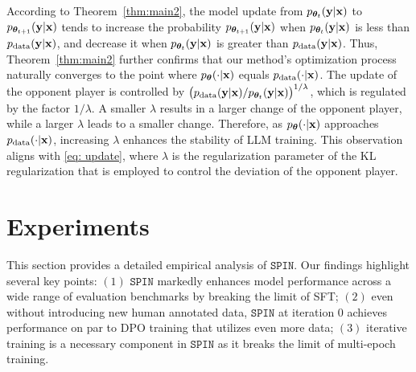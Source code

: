 \documentclass{article}
\newcommand{\method}{\texttt{SPIN}}
\begin{document}
\begin{remark}
According to Theorem~\ref{thm:main2}, the model update from $p_{\bm{\theta}_t}(\mathbf{y}|\mathbf{x})$ to $p_{\bm{\theta}_{t+1}}(\mathbf{y}|\mathbf{x})$ tends to increase the probability $p_{\bm{\theta}_{t+1}}(\mathbf{y}|\mathbf{x})$ when $p_{\bm{\theta}_t}(\mathbf{y}|\mathbf{x})$ is less than $p_{\mathrm{data}}(\mathbf{y}|\mathbf{x})$, and decrease it when $p_{\bm{\theta}_t}(\mathbf{y}|\mathbf{x})$ is greater than $p_{\mathrm{data}}(\mathbf{y}|\mathbf{x})$. Thus, Theorem~\ref{thm:main2} further confirms that our method's optimization process naturally converges to the point where $p_{\bm{\theta}}(\cdot|\mathbf{x})$ equals $p_{\mathrm{data}}(\cdot|\mathbf{x})$. The update of the opponent player is controlled by $\big(p_{\mathrm{data}}(\mathbf{y}|\mathbf{x})/p_{\bm{\theta}_{t}}(\mathbf{y}|\mathbf{x}) \big)^{1/\lambda}$, which is regulated by the factor $1/\lambda$. A smaller $\lambda$ results in a larger change of the opponent player, while a larger $\lambda$ leads to a smaller change. Therefore, as $p_{\bm{\theta}}(\cdot|\mathbf{x})$ approaches $p_{\mathrm{data}}(\cdot|\mathbf{x})$, increasing $\lambda$ enhances the stability of LLM training. This observation aligns with \eqref{eq: update}, where $\lambda$ is the regularization parameter of the KL regularization that is employed to control the deviation of the opponent player.
\end{remark}












\section{Experiments}\label{sec:regularization} 

This section provides a detailed empirical analysis of $\method$. Our findings highlight several key points: $(1)$ $\method$ markedly enhances model performance across a wide range of evaluation benchmarks by breaking the limit of SFT; $(2)$ even without introducing new human annotated data, $\method$ at iteration $0$ achieves performance on par to DPO training that utilizes even more data; $(3)$ iterative training is a necessary component in $\method$ as it breaks the limit of multi-epoch training.
\end{document}

